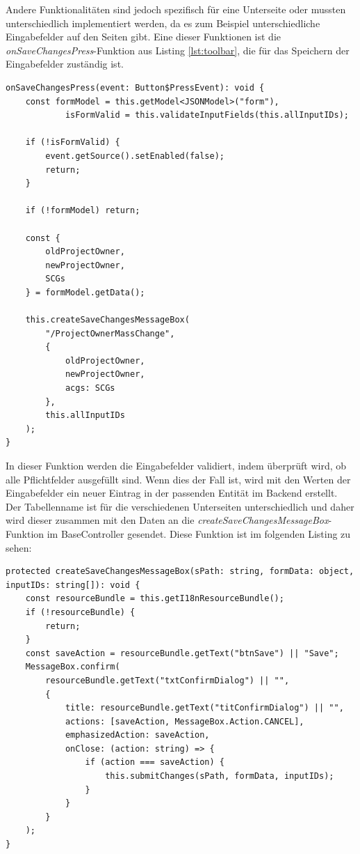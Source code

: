 Andere Funktionalitäten sind jedoch spezifisch für eine Unterseite oder mussten unterschiedlich implementiert werden, da es zum Beispiel unterschiedliche Eingabefelder auf den Seiten gibt.
Eine dieser Funktionen ist die \textit{onSaveChangesPress}-Funktion aus Listing \ref{lst:toolbar}, die für das Speichern der Eingabefelder zuständig ist.

\begin{lstlisting}[caption={onSaveChangesPress Funktion}]
onSaveChangesPress(event: Button$PressEvent): void {
    const formModel = this.getModel<JSONModel>("form"),
            isFormValid = this.validateInputFields(this.allInputIDs);

    if (!isFormValid) {
        event.getSource().setEnabled(false);
        return;
    }

    if (!formModel) return;

    const {
        oldProjectOwner,
        newProjectOwner,
        SCGs
    } = formModel.getData();

    this.createSaveChangesMessageBox(
        "/ProjectOwnerMassChange", 
        {                
            oldProjectOwner,
            newProjectOwner,
            acgs: SCGs
        },
        this.allInputIDs
    );
}
\end{lstlisting}

In dieser Funktion werden die Eingabefelder validiert, indem überprüft wird, ob alle Pflichtfelder ausgefüllt sind.
Wenn dies der Fall ist, wird mit den Werten der Eingabefelder ein neuer Eintrag in der passenden Entität im Backend erstellt.
Der Tabellenname ist für die verschiedenen Unterseiten unterschiedlich und daher wird dieser zusammen mit den Daten an die \textit{createSaveChangesMessageBox}-Funktion im BaseController gesendet.
Diese Funktion ist im folgenden Listing zu sehen:

\begin{lstlisting}[caption={createSaveChangesMessageBox Funktion}]
protected createSaveChangesMessageBox(sPath: string, formData: object, inputIDs: string[]): void {
    const resourceBundle = this.getI18nResourceBundle();
    if (!resourceBundle) {
        return;
    }
    const saveAction = resourceBundle.getText("btnSave") || "Save";
    MessageBox.confirm(
        resourceBundle.getText("txtConfirmDialog") || "",
        {
            title: resourceBundle.getText("titConfirmDialog") || "",
            actions: [saveAction, MessageBox.Action.CANCEL],
            emphasizedAction: saveAction,
            onClose: (action: string) => {
                if (action === saveAction) {
                    this.submitChanges(sPath, formData, inputIDs);
                }
            }
        }
    );
} 
\end{lstlisting}

